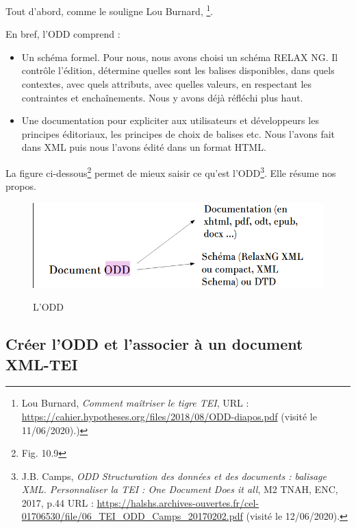Tout d'abord, comme le souligne Lou Burnard, \footnote{Lou Burnard, \emph{Comment maîtriser le tigre TEI}, URL : \url{https://cahier.hypotheses.org/files/2018/08/ODD-diapos.pdf} (visité le 11/06/2020).)}.

En bref, l'ODD comprend : 
\begin{itemize}
    \item Un schéma formel. Pour nous, nous avons choisi un schéma RELAX NG. Il contrôle l'édition, détermine quelles sont les balises disponibles, dans quels contextes, avec quels attributs, avec quelles valeurs, en respectant les contraintes et enchaînements. Nous y avons déjà réfléchi plus haut. 
    \item Une documentation pour expliciter aux utilisateurs et développeurs les principes éditoriaux, les principes de choix de balises etc. Nous l'avons fait dans XML puis nous l'avons édité dans un format HTML.
\end{itemize}
La figure ci-dessous\footnote{Fig. 10.9} permet de mieux saisir ce qu'est l'ODD\footnote{J.B. Camps, \emph{ODD Structuration des données et des documents : balisage XML. Personnaliser la TEI : One Document Does it all}, M2 TNAH, ENC, 2017, p.44 URL : \url{https://halshs.archives-ouvertes.fr/cel-01706530/file/06_TEI_ODD_Camps_20170202.pdf} (visité le 12/06/2020).}. Elle résume nos propos.
\begin{figure}[ht]
    \centering
    \caption{L'ODD}
    \includegraphics[width=16cm]{images/ODD.png}
    \label{ODD}
\end{figure}

\subsection{Créer l'ODD et l'associer à un document XML-TEI}

